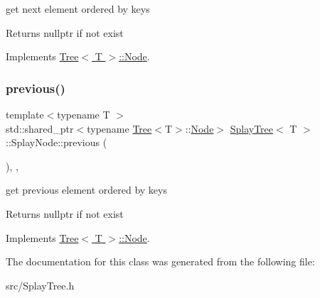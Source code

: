 get next element ordered by keys 

\begin{DoxyReturn}{Returns}
nullptr if not exist 
\end{DoxyReturn}


Implements \hyperlink{classTree_1_1Node_a50f15b262b0d6c572904be68ba067ca6}{Tree$<$ T $>$\+::\+Node}.

\mbox{\label{classSplayTree_1_1SplayNode_a6a89136b18f560485a4bda43ef15f560}} 
\subsubsection{\texorpdfstring{previous()}{previous()}}
{\footnotesize\ttfamily template$<$typename T $>$ \\
std\+::shared\+\_\+ptr$<$typename \hyperlink{classTree}{Tree}$<$T$>$\+::\hyperlink{classTree_1_1Node}{Node}$>$ \hyperlink{classSplayTree}{Splay\+Tree}$<$ T $>$\+::Splay\+Node\+::previous (\begin{DoxyParamCaption}{ }\end{DoxyParamCaption})\hspace{0.3cm}{\ttfamily [override]}, {\ttfamily [virtual]}, {\ttfamily [noexcept]}}



get previous element ordered by keys 

\begin{DoxyReturn}{Returns}
nullptr if not exist 
\end{DoxyReturn}


Implements \hyperlink{classTree_1_1Node_a3f912d90adc2c50de5ce7f96e6695c96}{Tree$<$ T $>$\+::\+Node}.



The documentation for this class was generated from the following file\+:\begin{DoxyCompactItemize}
\item 
src/Splay\+Tree.\+h\end{DoxyCompactItemize}
